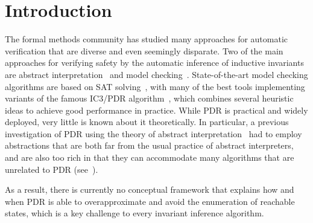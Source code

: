 \documentclass[acmsmall,screen]{acmart}
\begin{document}
%


%
%
%
%


%
%
%
%
\maketitle

%
%
%
%
%

%
\section{Introduction}
The formal methods community has studied many approaches for automatic verification that are diverse and even seemingly disparate.
%
Two of the main approaches for verifying safety by the automatic inference of inductive invariants are abstract interpretation~\cite{DBLP:conf/popl/CousotC77} and model checking~\cite{DBLP:conf/lop/ClarkeE81,DBLP:conf/programm/QueilleS82}.
%
State-of-the-art model checking algorithms are based on SAT solving~\cite[e.g.][]{DBLP:conf/cav/GrafS97,DBLP:conf/cav/McMillan03,DBLP:conf/fmcad/GurfinkelI17,DBLP:conf/sigsoft/GurfinkelSM16,DBLP:conf/fmcad/SheeranSS00,DBLP:conf/cav/AlbarghouthiLGC12}, with many of the best tools implementing variants of the famous IC3/PDR algorithm~\cite{ic3,pdr}, which combines several heuristic ideas to achieve good performance in practice.
While PDR is practical and widely deployed, very little is known about it theoretically.
In particular, a previous investigation of PDR using the theory of abstract interpretation~\cite{DBLP:conf/vmcai/RinetzkyS16} had to employ abstractions that are both far from the usual practice of abstract interpreters, and are also too rich in that they can accommodate many algorithms that are unrelated to PDR (see~).
%
\begin{changebar}
As a result, there is currently no conceptual framework that explains how and when PDR is able to overapproximate and avoid the enumeration of reachable states, which is a key challenge to every invariant inference algorithm.
\end{changebar}
\end{document}

